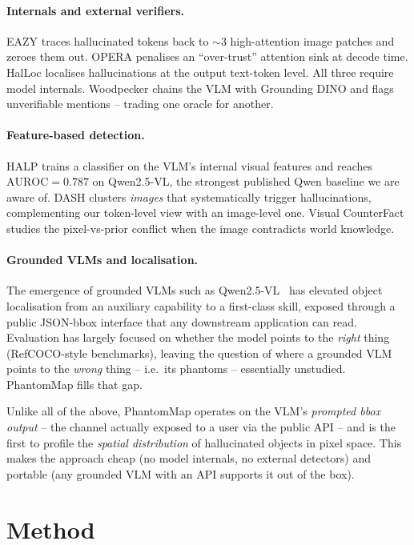 \documentclass[10pt,twocolumn,letterpaper]{article}
\begin{document}
\paragraph{Internals and external verifiers.} EAZY \cite{eazy} traces
hallucinated tokens back to $\sim 3$ high-attention image patches and
zeroes them out. OPERA \cite{opera} penalises an ``over-trust''
attention sink at decode time. HalLoc \cite{halloc} localises
hallucinations at the output text-token level. All three require
model internals. Woodpecker \cite{woodpecker} chains the VLM with
Grounding DINO and flags unverifiable mentions -- trading one oracle
for another.

\paragraph{Feature-based detection.} HALP \cite{halp} trains a
classifier on the VLM's internal visual features and reaches
$\mathrm{AUROC}=0.787$ on Qwen2.5-VL, the strongest published Qwen
baseline we are aware of. DASH \cite{dash} clusters \emph{images}
that systematically trigger hallucinations, complementing our
token-level view with an image-level one. Visual CounterFact
\cite{pixelsvspriors} studies the pixel-vs-prior conflict when the
image contradicts world knowledge.

\paragraph{Grounded VLMs and localisation.} The emergence of
grounded VLMs such as Qwen2.5-VL~\cite{qwen25vl} has elevated object
localisation from an auxiliary capability to a first-class skill,
exposed through a public JSON-bbox interface that any downstream
application can read. Evaluation has largely focused on whether the
model points to the \emph{right} thing (RefCOCO-style benchmarks),
leaving the question of where a grounded VLM points to the
\emph{wrong} thing -- i.e.\ its phantoms -- essentially unstudied.
PhantomMap fills that gap.

Unlike all of the above, PhantomMap operates on the VLM's
\emph{prompted bbox output} -- the channel actually exposed to a
user via the public API -- and is the first to profile the
\emph{spatial distribution} of hallucinated objects in pixel space.
This makes the approach cheap (no model internals, no external
detectors) and portable (any grounded VLM with an API supports it
out of the box).

\section{Method}
\end{document}

